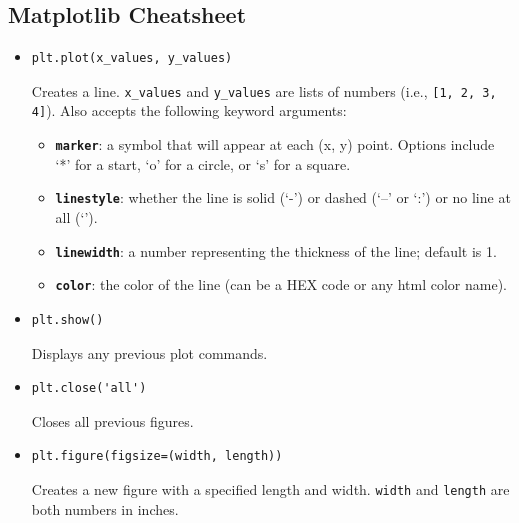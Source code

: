 \documentclass[a4paper]{article}
\begin{document}
\subsection{Matplotlib Cheatsheet}
\label{themeMethod}
\begin{itemize}


\item
\begin{lstlisting}
plt.plot(x_values, y_values)
\end{lstlisting}
Creates a line.  \texttt{x\_values} and  \texttt{y\_values} are lists of
numbers (i.e.,  \texttt{[1, 2, 3, 4]}).
Also accepts the following keyword arguments:

\begin{itemize}
    \item 
    \textbf{\texttt{marker}}: a symbol that will appear at each (x, y)
    point. Options include ‘*’ for a start, ‘o’ for a
    circle, or ‘s’ for a square.
    
    \item 
    \textbf{\texttt{linestyle}}: whether the line is solid (‘-’) or
    dashed (‘--’ or ‘:’) or no line at all (‘’).
   
    \item 
    \textbf{\texttt{linewidth}}: a number representing the thickness
    of the line; default is 1.
    
    \item
    \textbf{\texttt{color}}: the color of the line (can be a HEX code
    or any html color name).
\end{itemize}{}

\item
\begin{lstlisting}
plt.show()
\end{lstlisting}
Displays any previous plot commands.

\item
\begin{lstlisting}
plt.close('all')
\end{lstlisting}
Closes all previous figures.

\item
\begin{lstlisting}
plt.figure(figsize=(width, length))
\end{lstlisting}
Creates a new figure with a specified length and width.
\texttt{width} and \texttt{length} are both numbers in inches.


\end{itemize}
\end{document}
